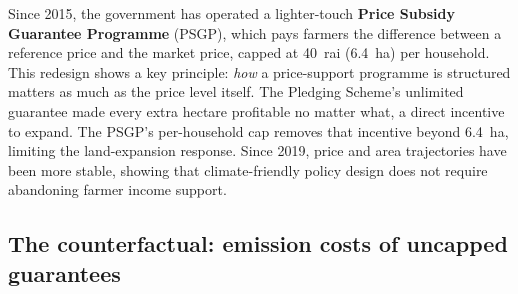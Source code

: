 \documentclass[fleqn,10pt]{olplainarticle}
\begin{document}
Since 2015, the government has operated a lighter-touch \textbf{Price Subsidy
Guarantee Programme} (PSGP), which pays farmers the difference between a
reference price and the market price, capped at 40~rai (6.4~ha) per household.
This redesign shows a key principle: \textit{how} a price-support programme
is structured matters as much as the price level itself.
The Pledging Scheme's unlimited guarantee made every extra hectare profitable
no matter what, a direct incentive to expand.
The PSGP's per-household cap removes that incentive beyond 6.4~ha, limiting
the land-expansion response.
Since 2019, price and area trajectories have been more stable, showing that
climate-friendly policy design does not require abandoning farmer income support.

\FloatBarrier
\subsection*{The counterfactual: emission costs of uncapped guarantees}
\end{document}
